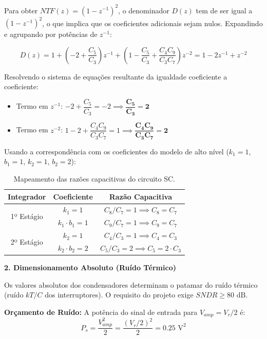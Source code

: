 Para obter $NTF(z) = (1 - z^{-1})^2$, o denominador $D(z)$ tem de ser igual a $(1-z^{-1})^2$,
o que implica que os coeficientes adicionais sejam nulos. Expandindo e agrupando por potências de $z^{-1}$:

\begin{equation}
    D(z) = 1 + \left(-2 + \frac{C_5}{C_3}\right)z^{-1} + \left(1 - \frac{C_5}{C_3} + \frac{C_4 C_9}{C_3 C_7}\right)z^{-2} = 1 - 2z^{-1} + z^{-2}
\end{equation}

Resolvendo o sistema de equações resultante da igualdade coeficiente a coeficiente:
\begin{itemize}
    \item Termo em $z^{-1}$: $-2 + \dfrac{C_5}{C_3} = -2 \implies \mathbf{\dfrac{C_5}{C_3} = 2}$
    \item Termo em $z^{-2}$: $1 - 2 + \dfrac{C_4 C_9}{C_3 C_7} = 1 \implies \mathbf{\dfrac{C_4 C_9}{C_3 C_7} = 2}$
\end{itemize}

Usando a correspondência com os coeficientes do modelo de alto nível ($k_1=1$, $b_1=1$, $k_2=1$, $b_2=2$):

\begin{table}[H]
    \centering
    \begin{tabular}{|c|c|c|}
        \hline
        \textbf{Integrador} & \textbf{Coeficiente} & \textbf{Razão Capacitiva} \\
        \hline
        \multirow{2}{*}{1º Estágio} & $k_1 = 1$ & $C_8/C_7 = 1 \implies C_8 = C_7$ \\
        & $k_1 \cdot b_1 = 1$ & $C_9/C_7 = 1 \implies C_9 = C_7$ \\
        \hline
        \multirow{2}{*}{2º Estágio} & $k_2 = 1$ & $C_4/C_3 = 1 \implies C_4 = C_3$ \\
        & $k_2 \cdot b_2 = 2$ & $C_5/C_3 = 2 \implies C_5 = 2 \cdot C_3$ \\
        \hline
    \end{tabular}
    \caption{Mapeamento das razões capacitivas do circuito SC.}
\end{table}

\textbf{2. Dimensionamento Absoluto (Ruído Térmico)}

Os valores absolutos dos condensadores determinam o patamar do ruído térmico (ruído $kT/C$
dos interruptores). O requisito do projeto exige $SNDR \ge 80\text{ dB}$.

\textbf{Orçamento de Ruído:}
A potência do sinal de entrada para $V_{amp} = V_r / 2$ é:
$$P_s = \frac{V_{amp}^2}{2} = \frac{(V_r/2)^2}{2} = 0.25 \text{ V}^2$$

